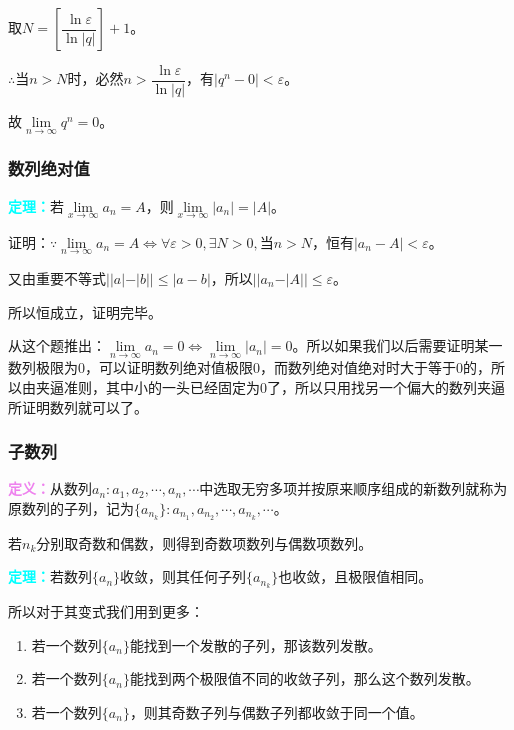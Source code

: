 \documentclass[UTF8, 12pt]{ctexart}
\begin{document}
取$N=\left[\dfrac{\ln\varepsilon}{\ln\vert q\vert}\right]+1$。

$\therefore$当$n>N$时，必然$n>\dfrac{\ln\varepsilon}{\ln\vert q\vert}$，有$\vert q^n-0\vert<\varepsilon$。

故$\lim\limits_{n\to\infty}q^n=0$。

\subsubsection{数列绝对值}

\textcolor{aqua}{\textbf{定理：}}若$\lim\limits_{x\to\infty}a_n=A$，则$\lim\limits_{x\to\infty}\vert a_n\vert=\vert A\vert$。

证明：$\because\lim\limits_{n\to\infty}a_n=A\Leftrightarrow\forall\varepsilon>0,\exists N>0,\text{当}n>N$，恒有$\vert a_n-A\vert<\varepsilon$。

又由重要不等式$\vert\vert a\vert-\vert b\vert\vert\leqslant\vert a-b\vert$，所以$\vert\vert a_n-\vert A\vert\vert\leqslant\varepsilon$。

所以恒成立，证明完毕。

从这个题推出：$\lim\limits_{n\to\infty}a_n=0\Leftrightarrow\lim\limits_{n\to\infty}\vert a_n\vert=0$。所以如果我们以后需要证明某一数列极限为0，可以证明数列绝对值极限0，而数列绝对值绝对时大于等于0的，所以由夹逼准则，其中小的一头已经固定为0了，所以只用找另一个偏大的数列夹逼所证明数列就可以了。

\subsubsection{子数列}

\textcolor{violet}{\textbf{定义：}}从数列${a_n}:a_1,a_2,\cdots,a_n,\cdots$中选取无穷多项并按原来顺序组成的新数列就称为原数列的子列，记为$\{a_{n_k}\}:a_{n_1},a_{n_2},\cdots,a_{n_k},\cdots$。

若$n_k$分别取奇数和偶数，则得到奇数项数列与偶数项数列。

\textcolor{aqua}{\textbf{定理：}}若数列$\{a_n\}$收敛，则其任何子列$\{a_{n_k}\}$也收敛，且极限值相同。

所以对于其变式我们用到更多：

\begin{enumerate}
    \item 若一个数列$\{a_n\}$能找到一个发散的子列，那该数列发散。
    \item 若一个数列$\{a_n\}$能找到两个极限值不同的收敛子列，那么这个数列发散。
    \item 若一个数列$\{a_n\}$，则其奇数子列与偶数子列都收敛于同一个值。
\end{enumerate}
\end{document}

